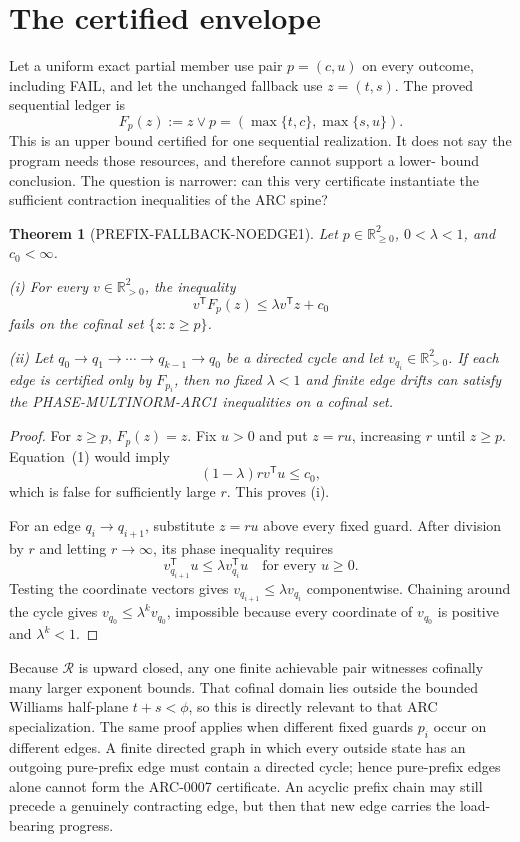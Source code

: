\documentclass[11pt]{article}
\newtheorem{theorem}{Theorem}
\newcommand{\R}{\mathcal R}
\begin{document}
\section{The certified envelope}
Let a uniform exact partial member use pair \(p=(c,u)\) on every outcome,
including FAIL, and let the unchanged fallback use \(z=(t,s)\).  The proved
sequential ledger is
\[
 F_p(z):=z\vee p=(\max\{t,c\},\max\{s,u\}).
\]
This is an upper bound certified for one sequential realization.  It does not
say the program needs those resources, and therefore cannot support a lower-
bound conclusion.  The question is narrower: can this very certificate
instantiate the sufficient contraction inequalities of the ARC spine?

\begin{theorem}[PREFIX-FALLBACK-NOEDGE1]
Let \(p\in\mathbb R_{\ge0}^2\), \(0<\lambda<1\), and \(c_0<\infty\).

\noindent(i) For every \(v\in\mathbb R_{>0}^2\), the inequality
\[
 v^{\mathsf T}F_p(z)\le\lambda v^{\mathsf T}z+c_0
 \tag{1}
\]
fails on the cofinal set \(\{z:z\ge p\}\).

\noindent(ii) Let \(q_0\to q_1\to\cdots\to q_{k-1}\to q_0\) be a directed
cycle and let \(v_{q_i}\in\mathbb R_{>0}^2\).  If each edge is certified only
by \(F_{p_i}\), then no fixed \(\lambda<1\) and finite edge drifts can satisfy
the PHASE-MULTINORM-ARC1 inequalities on a cofinal set.
\end{theorem}
\begin{proof}
For \(z\ge p\), \(F_p(z)=z\).  Fix \(u>0\) and put \(z=ru\), increasing
\(r\) until \(z\ge p\).  Equation~(1) would imply
\[
 (1-\lambda)r v^{\mathsf T}u\le c_0,
\]
which is false for sufficiently large \(r\).  This proves (i).

For an edge \(q_i\to q_{i+1}\), substitute \(z=ru\) above every fixed guard.
After division by \(r\) and letting \(r\to\infty\), its phase inequality
requires
\[
 v_{q_{i+1}}^{\mathsf T}u
 \le\lambda v_{q_i}^{\mathsf T}u
 \quad\text{for every }u\ge0.
\]
Testing the coordinate vectors gives
\(v_{q_{i+1}}\le\lambda v_{q_i}\) componentwise.  Chaining around the cycle
gives \(v_{q_0}\le\lambda^k v_{q_0}\), impossible because every coordinate
of \(v_{q_0}\) is positive and \(\lambda^k<1\).
\end{proof}

Because \(\R\) is upward closed, any one finite achievable pair witnesses
cofinally many larger exponent bounds.  That cofinal domain lies outside the
bounded Williams half-plane
\(t+s<\phi\), so this is directly relevant to that ARC specialization.  The
same proof applies when different fixed guards \(p_i\) occur on different
edges.  A finite directed graph in which every outside state has an outgoing
pure-prefix edge must contain a directed cycle; hence pure-prefix edges alone
cannot form the ARC-0007 certificate.  An acyclic prefix chain may still
precede a genuinely contracting edge, but then that new edge carries the
load-bearing progress.
\end{document}
